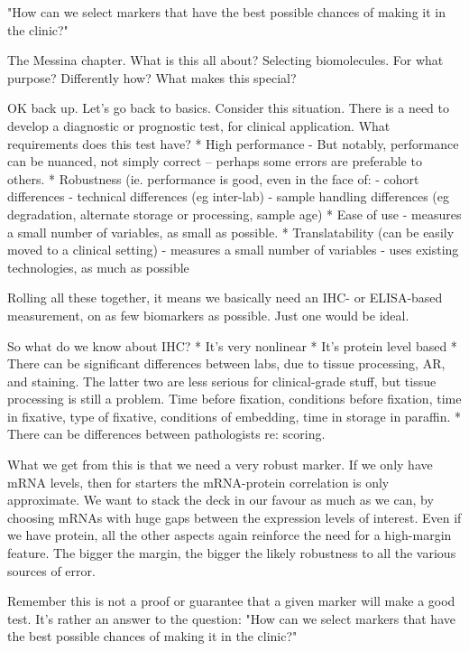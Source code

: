 \documentclass[dissertation.tex]{subfiles}
\begin{document}
"How can we select markers that have the best possible chances of making it in the clinic?"


The Messina chapter.  What is this all about?  Selecting biomolecules.  For what purpose?  Differently how?  What makes this special?

OK back up.  Let's go back to basics.  Consider this situation.  There is a need to develop a diagnostic or prognostic test, for clinical application.  What requirements does this test have?
  * High performance
    - But notably, performance can be nuanced, not simply correct -- perhaps some errors are preferable to others.
  * Robustness (ie. performance is good, even in the face of:
    - cohort differences
    - technical differences (eg inter-lab)
    - sample handling differences (eg degradation, alternate storage or processing, sample age)
  * Ease of use
    - measures a small number of variables, as small as possible.
  * Translatability (can be easily moved to a clinical setting)
    - measures a small number of variables
    - uses existing technologies, as much as possible

Rolling all these together, it means we basically need an IHC- or ELISA-based measurement, on as few biomarkers as possible.  Just one would be ideal.

So what do we know about IHC?
  * It's very nonlinear
  * It's protein level based
  * There can be significant differences between labs, due to tissue processing, AR, and staining.  The latter two are less serious for clinical-grade stuff, but tissue processing is still a problem.  Time before fixation, conditions before fixation, time in fixative, type of fixative, conditions of embedding, time in storage in paraffin.
  * There can be differences between pathologists re: scoring.

What we get from this is that we need a very robust marker.  If we only have mRNA levels, then for starters the mRNA-protein correlation is only approximate.  We want to stack the deck in our favour as much as we can, by choosing mRNAs with huge gaps between the expression levels of interest.  Even if we have protein, all the other aspects again reinforce the need for a high-margin feature.  The bigger the margin, the bigger the likely robustness to all the various sources of error.

Remember this is not a proof or guarantee that a given marker will make a good test.  It's rather an answer to the question: "How can we select markers that have the best possible chances of making it in the clinic?"
\end{document}

